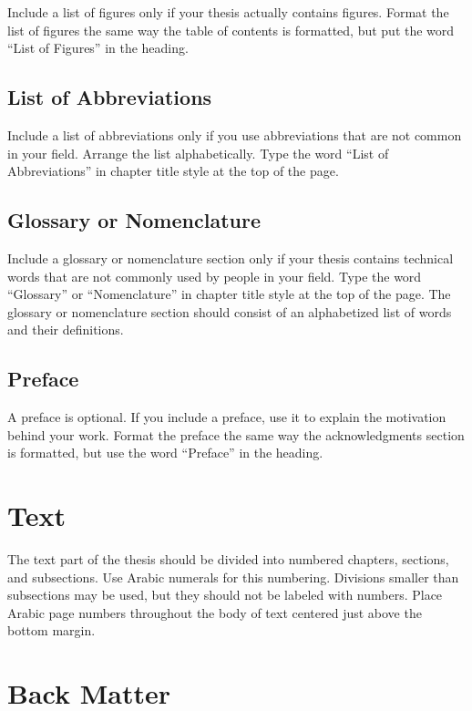 Include a list of figures only if your thesis actually contains
figures. Format the list of figures the same way the table of contents
is formatted, but put the word ``List of Figures'' in the heading.

\subsection{List of Abbreviations}

Include a list of abbreviations only if you use abbreviations that are
not common in your field.  Arrange the list alphabetically.  Type the
word ``List of Abbreviations'' in chapter title style at the top of the
page.

\subsection{Glossary or Nomenclature}

Include a glossary or nomenclature section only if your thesis
contains technical words that are not commonly used by people in your
field.  Type the word ``Glossary'' or ``Nomenclature'' in chapter title
style at the top of the page.  The glossary or nomenclature section
should consist of an alphabetized list of words and their definitions.

\subsection{Preface}

A preface is optional.  If you include a preface, use it to explain the
motivation behind your work.  Format the preface the same way the
acknowledgments section is formatted, but use the word ``Preface'' in the
heading.

\section{Text}

The text part of the thesis should be divided into numbered chapters, sections,
and subsections.  Use Arabic numerals for this numbering.   Divisions smaller
than subsections may be used, but they should not be labeled with numbers.
Place Arabic page numbers throughout the body of text centered just above the
bottom margin.

\section{Back Matter}

